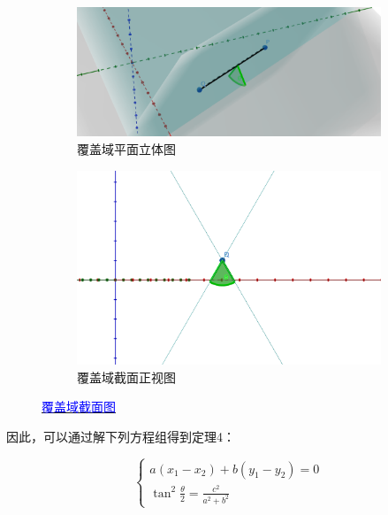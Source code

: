 \begin{figure}[htbp]
    \centering
    \begin{subfigure}[b]{0.45\textwidth}
      \centering
      \includegraphics[scale=0.15]{res/img/覆盖域平面_几何.png}
      \caption{覆盖域平面立体图}
      \label{fig:覆盖域平面立体图}
    \end{subfigure}
    \hfill
    \begin{subfigure}[b]{0.45\textwidth}
      \centering
      \includegraphics[scale=0.15]{res/img/覆盖域平面_截面正视图.png}
      \caption{覆盖域截面正视图}
      \label{fig:覆盖域截面正视图}
    \end{subfigure}
    \caption{\href{https://www.geogebra.org/m/zafwcq6e}{\textcolor{blue}{覆盖域截面图}}}
    \label{fig:覆盖域截面图}
\end{figure}

因此，可以通过解下列方程组得到定理4：

\begin{equation}
    \begin{cases}
        a(x_1 - x_2) + b(y_1 - y_2) = 0 \\
        \tan^2\frac{\theta}{2} = \frac{c^2}{a^2 + b^2}
    \end{cases}
\end{equation}

